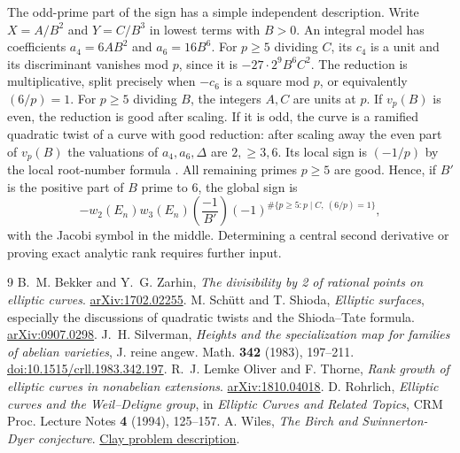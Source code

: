 \documentclass[11pt]{article}
\begin{document}
The odd-prime part of the sign has a simple independent description.
Write $X=A/B^2$ and $Y=C/B^3$ in lowest terms with $B>0$.
An integral model has coefficients $a_4=6AB^2$ and $a_6=16B^6$.
For $p\ge5$ dividing $C$, its $c_4$ is a unit and its discriminant
vanishes mod $p$, since it is $-27\cdot 2^9 B^6 C^2$. The reduction
is multiplicative, split precisely when $-c_6$ is a square mod $p$,
or equivalently $(6/p)=1$. For $p\ge5$ dividing $B$, the integers
$A,C$ are units at $p$. If $v_p(B)$ is even, the reduction is good
after scaling. If it is odd, the curve is a ramified quadratic twist
of a curve with good reduction: after scaling away the even part of
$v_p(B)$ the valuations of $a_4,a_6,\Delta$ are $2,\ge3,6$.
Its local sign is $(-1/p)$ by the local root-number formula
\cite{Root}. All remaining primes $p\ge5$ are good. Hence, if $B'$
is the positive part of $B$ prime to $6$, the global sign is
\[
 -w_2(E_n)w_3(E_n)
 \left(\frac{-1}{B'}\right)
 (-1)^{\#\{p\ge5:p\mid C,\ (6/p)=1\}},
\]
with the Jacobi symbol in the middle. Determining a central second
derivative or proving exact analytic rank requires further input.

\begin{thebibliography}{9}
 B.~M. Bekker and Y.~G. Zarhin,
\emph{The divisibility by 2 of rational points on elliptic curves}.
\href{https://arxiv.org/abs/1702.02255}{arXiv:1702.02255}.
 M. Sch\"utt and T. Shioda, \emph{Elliptic surfaces},
especially the discussions of quadratic twists and the Shioda--Tate formula.
\href{https://arxiv.org/abs/0907.0298}{arXiv:0907.0298}.
 J.~H. Silverman,
\emph{Heights and the specialization map for families of abelian varieties},
J. reine angew. Math. \textbf{342} (1983), 197--211.
\href{https://doi.org/10.1515/crll.1983.342.197}{doi:10.1515/crll.1983.342.197}.
 R.~J. Lemke Oliver and F. Thorne,
\emph{Rank growth of elliptic curves in nonabelian extensions}.
\href{https://arxiv.org/abs/1810.04018}{arXiv:1810.04018}.
 D. Rohrlich, \emph{Elliptic curves and the Weil--Deligne group},
in \emph{Elliptic Curves and Related Topics}, CRM Proc. Lecture Notes
\textbf{4} (1994), 125--157.
 A. Wiles, \emph{The Birch and Swinnerton-Dyer conjecture}.
\href{https://www.claymath.org/wp-content/uploads/2022/05/birchswin.pdf}{Clay problem description}.
\end{thebibliography}
\end{document}

